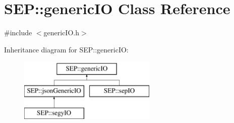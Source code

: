 \hypertarget{class_s_e_p_1_1generic_i_o}{}\section{S\+EP\+:\+:generic\+IO Class Reference}
\label{class_s_e_p_1_1generic_i_o}


{\ttfamily \#include $<$generic\+I\+O.\+h$>$}

Inheritance diagram for S\+EP\+:\+:generic\+IO\+:\begin{figure}[H]
\begin{center}
\leavevmode
\includegraphics[height=3.000000cm]{class_s_e_p_1_1generic_i_o}
\end{center}
\end{figure}
